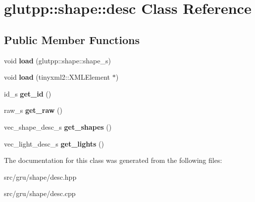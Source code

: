 \hypertarget{classglutpp_1_1shape_1_1desc}{\section{glutpp\-:\-:shape\-:\-:desc \-Class \-Reference}
\label{classglutpp_1_1shape_1_1desc}
}
\subsection*{\-Public \-Member \-Functions}
\begin{DoxyCompactItemize}
\item 
\hypertarget{classglutpp_1_1shape_1_1desc_aa1ff27b705edd72055d11099419e6619}{void {\bfseries load} (glutpp\-::shape\-::shape\-\_\-s)}\label{classglutpp_1_1shape_1_1desc_aa1ff27b705edd72055d11099419e6619}

\item 
\hypertarget{classglutpp_1_1shape_1_1desc_ab9501dfe951478d4f026f333539e2154}{void {\bfseries load} (tinyxml2\-::\-X\-M\-L\-Element $\ast$)}\label{classglutpp_1_1shape_1_1desc_ab9501dfe951478d4f026f333539e2154}

\item 
\hypertarget{classglutpp_1_1shape_1_1desc_af4f62664ad5d9a472bef87f4aed29958}{id\-\_\-s {\bfseries get\-\_\-id} ()}\label{classglutpp_1_1shape_1_1desc_af4f62664ad5d9a472bef87f4aed29958}

\item 
\hypertarget{classglutpp_1_1shape_1_1desc_a5410eaa3b46407567ccb96a73ca92331}{raw\-\_\-s {\bfseries get\-\_\-raw} ()}\label{classglutpp_1_1shape_1_1desc_a5410eaa3b46407567ccb96a73ca92331}

\item 
\hypertarget{classglutpp_1_1shape_1_1desc_a3f96ef50ce36d2d46246c757014785a0}{vec\-\_\-shape\-\_\-desc\-\_\-s {\bfseries get\-\_\-shapes} ()}\label{classglutpp_1_1shape_1_1desc_a3f96ef50ce36d2d46246c757014785a0}

\item 
\hypertarget{classglutpp_1_1shape_1_1desc_af360e581fb7581bf29af33a043e0a27e}{vec\-\_\-light\-\_\-desc\-\_\-s {\bfseries get\-\_\-lights} ()}\label{classglutpp_1_1shape_1_1desc_af360e581fb7581bf29af33a043e0a27e}

\end{DoxyCompactItemize}


\-The documentation for this class was generated from the following files\-:\begin{DoxyCompactItemize}
\item 
src/gru/shape/desc.\-hpp\item 
src/gru/shape/desc.\-cpp\end{DoxyCompactItemize}
